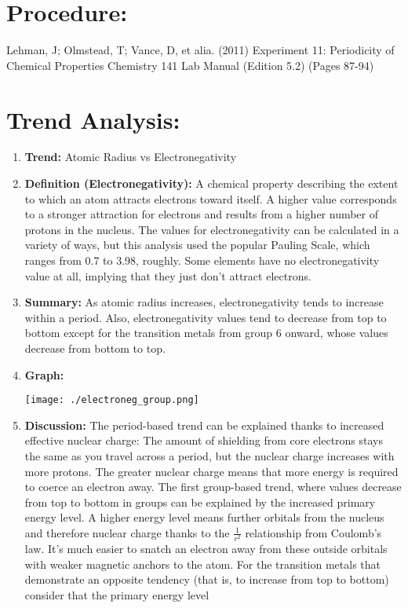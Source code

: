 \documentclass[11pt,letterpaper]{report}
\begin{document}
 



\section*{Procedure:}
Lehman, J; Olmstead, T; Vance, D, et alia. (2011)
Experiment 11: Periodicity of Chemical Properties
Chemistry 141 Lab Manual (Edition 5.2) (Pages 87-94)

\section*{Trend Analysis:}
\begin{enumerate}
  \item \textbf{Trend:} Atomic Radius vs Electronegativity \\
  \item \textbf{Definition (Electronegativity):} A chemical property describing the extent to which an atom attracts electrons toward itself. A higher value corresponds to a stronger attraction for electrons and results from a higher number of protons in the nucleus. The values for electronegativity can be calculated in a variety of ways, but this analysis used the popular Pauling Scale, which ranges from 0.7 to 3.98, roughly. Some elements have no electronegativity value at all, implying that they just don't attract electrons. \\
  \item \textbf{Summary:} As atomic radius increases, electronegativity tends to increase within a period. Also, electronegativity values tend to decrease from top to bottom except for the transition metals from group 6 onward, whose values decrease from bottom to top. \\
  \item \textbf{Graph:} \\
  \begin{center}
    \texttt{[image: ./electroneg\_group.png]}\\[0.7cm]
  \end{center}
  \item \textbf{Discussion:} The period-based trend can be explained thanks to increased effective nuclear charge: The amount of shielding from core electrons stays the same as you travel across a period, but the nuclear charge increases with more protons. The greater nuclear charge means that more energy is required to coerce an electron away. The first group-based trend, where values decrease from top to bottom in groups can be explained by the increased primary energy level. A higher energy level means further orbitals from the nucleus and therefore nuclear charge thanks to the $\frac{1}{r^2}$ relationship from Coulomb's law. It's much easier to snatch an electron away from these outside orbitals with weaker magnetic anchors to the atom.  For the transition metals that demonstrate an opposite tendency (that is, to increase from top to bottom) consider that the primary energy level 

\end{enumerate}
\end{document}
